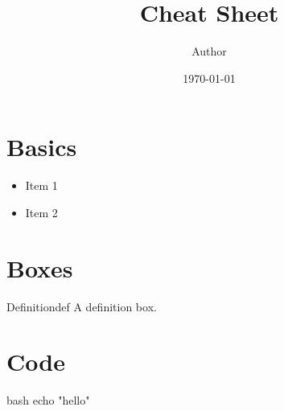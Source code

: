 \documentclass[columns=3,colsep=10pt,textsize=footnotesize,colorscheme=Base]{Hypo-CHSH}
\title{Cheat Sheet}
\author{Author}
\date{\today}
\begin{document}
\maketitle

\section{Basics}
\begin{itemize}
  \item Item 1
  \item Item 2
\end{itemize}

\section{Boxes}
\begin{definition}{Definition}{def}
A definition box.
\end{definition}

\section{Code}
\begin{hypocode}{bash}
echo "hello"
\end{hypocode}
\end{document}

